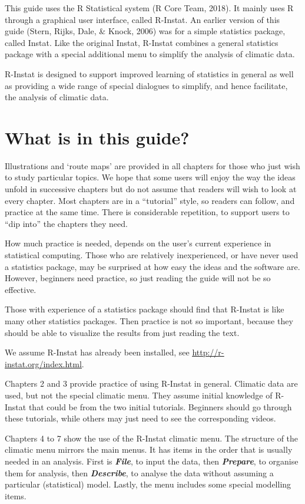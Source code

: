 \documentclass[
  letterpaper,
  DIV=11,
  numbers=noendperiod]{scrreprt}
\begin{document}
This guide uses the R Statistical system (R Core Team, 2018). It mainly
uses R through a graphical user interface, called R-Instat. An earlier
version of this guide (Stern, Rijks, Dale, \& Knock, 2006) was for a
simple statistics package, called Instat. Like the original Instat,
R-Instat combines a general statistics package with a special additional
menu to simplify the analysis of climatic data.

R-Instat is designed to support improved learning of statistics in
general as well as providing a wide range of special dialogues to
simplify, and hence facilitate, the analysis of climatic data.

\section{What is in this guide?}\label{what-is-in-this-guide}

Illustrations and `route maps' are provided in all chapters for those
who just wish to study particular topics. We hope that some users will
enjoy the way the ideas unfold in successive chapters but do not assume
that readers will wish to look at every chapter. Most chapters are in a
``tutorial'' style, so readers can follow, and practice at the same
time. There is considerable repetition, to support users to ``dip into''
the chapters they need.

How much practice is needed, depends on the user's current experience in
statistical computing. Those who are relatively inexperienced, or have
never used a statistics package, may be surprised at how easy the ideas
and the software are. However, beginners need practice, so just reading
the guide will not be so effective.

Those with experience of a statistics package should find that R-Instat
is like many other statistics packages. Then practice is not so
important, because they should be able to visualize the results from
just reading the text.

We assume R-Instat has already been installed, see
\href{http://r-instat.org/index.html}{\ul{http://r-instat.org/index.html}}.

Chapters 2 and 3 provide practice of using R-Instat in general. Climatic
data are used, but not the special climatic menu. They assume initial
knowledge of R-Instat that could be from the two initial tutorials.
Beginners should go through these tutorials, while others may just need
to see the corresponding videos.

Chapters 4 to 7 show the use of the R-Instat climatic menu. The
structure of the climatic menu mirrors the main menus. It has items in
the order that is usually needed in an analysis. First is
\textbf{\emph{File}}, to input the data, then \textbf{\emph{Prepare}},
to organise them for analysis, then \textbf{\emph{Describe}}, to analyse
the data without assuming a particular (statistical) model. Lastly, the
menu includes some special modelling items.
\end{document}
